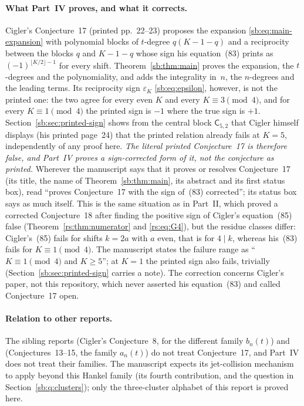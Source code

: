 \documentclass[11pt]{article}
\theoremstyle{definition}
\theoremstyle{remark}
\newcommand{\Cblock}{\mathsf C}
\newcommand{\epsK}{\varepsilon}
\theoremstyle{definition}
\theoremstyle{plain}
\numberwithin{equation}{section}
\begin{document}
\paragraph{What Part~IV proves, and what it corrects.}
Cigler's Conjecture~17 \cite{Cigler} (printed pp.~22--23) proposes the
expansion \eqref{sb:eq:main-expansion} with polynomial blocks of
$t$-degree $q(K-1-q)$ and a reciprocity between the blocks $q$ and
$K-1-q$ whose sign his equation~(83) prints as $(-1)^{\lfloor K/2\rfloor-1}$
for every shift. Theorem~\ref{sb:thm:main} proves the expansion, the
$t$-degrees and the polynomiality, and adds the integrality in~$n$, the
$n$-degrees and the leading terms. Its reciprocity sign $\epsK_K$
\eqref{sb:eq:epsilon}, however, is not the printed one: the two agree for
every even $K$ and every $K\equiv3\pmod4$, and for every
$K\equiv1\pmod4$ the printed sign is $-1$ where the true sign is $+1$.
Section~\ref{sb:sec:printed-sign} shows from the central block $\Cblock_{5,2}$
that Cigler himself displays (his printed page~24) that the printed
relation already fails at $K=5$, independently of any proof here. \emph{The
literal printed Conjecture~17 is therefore false, and Part~IV proves a
sign-corrected form of it, not the conjecture as printed.} Wherever the
manuscript says that it proves or resolves Conjecture~17 (its title, the name
of Theorem~\ref{sb:thm:main}, its abstract and its first status box), read
``proves Conjecture~17 with the sign of~(83) corrected''; its status box
says as much itself. This is the same situation as in Part~II, which proved
a corrected Conjecture~18 after finding the positive sign of Cigler's
equation~(85) false (Theorem~\ref{rs:thm:numerator} and
\eqref{rs:eq:G4}), but the residue classes differ: Cigler's~(85) fails for
shifts $k=2a$ with $a$ even, that is for $4\mid k$, whereas his~(83) fails
for $K\equiv1\pmod4$. The manuscript states the failure range as
``$K\equiv1\pmod4$ and $K\ge5$''; at $K=1$ the printed sign also fails,
trivially (Section~\ref{sb:sec:printed-sign} carries a note). The
correction concerns Cigler's paper, not this repository, which never
asserted his equation~(83) and called Conjecture~17 open.

\paragraph{Relation to other reports.} The sibling reports
 (Cigler's Conjecture~8, for the different
family $b_n(t)$) and 
(Conjectures~13--15, the family $a_n(t)$) do not treat Conjecture~17, and
Part~IV does not treat their families. The manuscript expects its
jet-collision mechanism to apply beyond this Hankel family (its fourth
contribution, and the question in Section~\ref{sb:q:clusters}); only the
three-cluster alphabet of this report is proved here.
\end{document}
